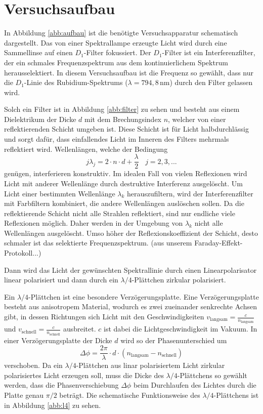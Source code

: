 \section{Versuchsaufbau}
In Abbildung \ref{abb:aufbau} ist die benötigte Versuchsapparatur schematisch dargestellt.
Das von einer Spektrallampe erzeugte Licht wird durch eine Sammellinse auf einen $D_1$-Filter fokussiert. Der $D_1$-Filter ist ein Interferenzfilter, der ein schmales Frequenzspektrum aus dem kontinuierlichem Spektrum herausselektiert. In diesem Versuchsaufbau ist die Frequenz so gewählt, dass nur die $D_1$-Linie des Rubidium-Spektrums ($\lambda=794,8\,\text{nm}$) durch den Filter gelassen wird.

Solch ein Filter ist in Abbildung \ref{abb:filter} zu sehen und besteht aus einem Dielektrikum der Dicke $d$ mit dem Brechungsindex $n$, welcher von einer reflektierenden Schicht umgeben ist. 
Diese Schicht ist für Licht halbdurchlässig und sorgt dafür, dass einfallendes Licht im Inneren des Filters mehrmals reflektiert wird.
Wellenlängen, welche der Bedingung
\begin{equation}
  j\lambda_j=2\cdot n\cdot d +\frac{\lambda}{2}~~~~j=2,3,...
\end{equation}
genügen, interferieren konstruktiv. 
Im idealen Fall von vielen Reflexionen wird Licht mit anderer Wellenlänge durch destruktive Interferenz ausgelöscht.
Um Licht einer bestimmten Wellenlänge $\lambda_k$ herauszufiltern, wird der Interferenzfilter mit Farbfiltern kombiniert, die andere Wellenlängen auslöschen sollen. 
Da die reflektierende Schicht nicht alle Strahlen reflektiert, sind nur endliche viele Reflexionen möglich.
Daher werden in der Umgebung von $\lambda_k$ nicht alle Wellenlängen ausgelöscht. 
Umso höher der Reflexionskoeffizient der Schicht, desto schmaler ist das selektierte Frequenzspektrum. (aus unserem Faraday-Effekt-Protokoll...)

Dann wird das Licht der gewünschten Spektrallinie durch einen Linearpolarisator linear polarisiert und dann durch ein $\lambda/4$-Plättchen zirkular polarisiert.

Ein $\lambda/4$-Plättchen ist eine besondere Verzögerungsplatte.
Eine Verzögerungsplatte besteht aus anisotropem Material, wodurch  es zwei zueinander senkrechte Achsen gibt, in dessen Richtungen sich Licht mit den Geschwindigkeiten $v_\text{langsam}=\frac{c}{n_\text{langsam}}$ und $v_\text{schnell}=\frac{c}{n_\text{schnell}}$ ausbreitet. $c$ ist dabei die Lichtgeschwindigkeit im Vakuum.
In einer Verzögerungsplatte der Dicke $d$ wird so der Phasenunterschied um 
\begin{equation*}
  \Delta \phi=\frac{2\pi}{\lambda}\cdot d \cdot (n_\text{langsam}-n_\text{schnell})
\end{equation*}
verschoben.
Da ein $\lambda/4$-Plättchen aus linar polarisiertem Licht zirkular polarisiertes Licht erzeugen soll, muss die Dicke des $\lambda/4$-Plättchens so gewählt werden, dass die Phasenverschiebung $\Delta \phi$ beim Durchlaufen des Lichtes durch die Platte genau $\pi/2$ beträgt. Die schematische Funktionsweise des $\lambda/4$-Plättchens ist in Abbildung \ref{abb:l4} zu sehen.

